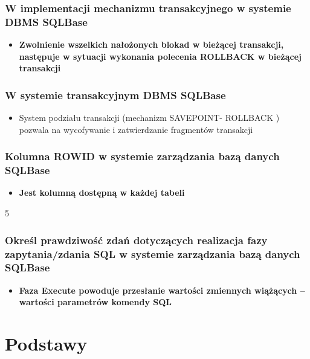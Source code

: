 \documentclass[a4paper,twoside]{article}
\begin{document}
  	\section{W implementacji mechanizmu transakcyjnego w systemie DBMS SQLBase}
  	\begin{itemize}
  		\item \textbf{Zwolnienie wszelkich nałożonych blokad w bieżącej transakcji, następuje w sytuacji wykonania polecenia ROLLBACK w bieżącej transakcji}
  	\end{itemize}
  	
  	\section{W systemie transakcyjnym DBMS SQLBase}
  	\begin{itemize}
  		\item System podziału transakcji (mechanizm SAVEPOINT- ROLLBACK ) pozwala na wycofywanie i zatwierdzanie fragmentów transakcji
  	\end{itemize}
  	
  	\section{Kolumna ROWID w systemie zarządzania bazą danych SQLBase}
  	\begin{itemize}
  		\item \textbf{Jest kolumną dostępną w każdej tabeli}
  	\end{itemize}5
  	
  	\section{Określ prawdziwość zdań dotyczących realizacja fazy zapytania/zdania SQL w systemie zarządzania bazą danych SQLBase}
  	\begin{itemize}
  		\item \textbf{Faza Execute powoduje przesłanie wartości zmiennych wiążących – wartości parametrów komendy SQL}
  	\end{itemize}
  	
  	
  	\part*{Podstawy}
\end{document}
